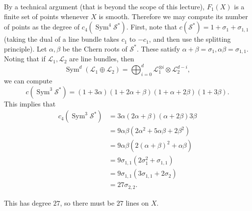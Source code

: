 \documentclass{amsart}
\theoremstyle{definition}
\theoremstyle{remark}
\theoremstyle{plain}
\theoremstyle{definition}
\theoremstyle{remark}
\newcommand{\mc}[1]{\mathcal{#1}}
\newcommand{\on}[1]{\operatorname{#1}}
\newcommand{\1}{\mathbf{1}}
\newcommand{\2}{\mathbf{2}}
\newcommand{\3}{\mathbf{3}}
\begin{document}
By a technical argument (that is beyond the scope of this lecture), $F_1(X)$ is a finite set of points whenever $X$ is smooth. Therefore we may compute its number of points as the degree of $c_4(\on{Sym}^4 \mc{S}^*)$. First, note that $c(\mc{S}^*) = 1 + \sigma_1 + \sigma_{1,1}$ (taking the dual of a line bundle takes $c_1$ to $-c_1$, and then use the splitting principle). Let $\alpha, \beta$ be the Chern roots of $\mc{S}^*$. These satisfy $\alpha + \beta = \sigma_1, \alpha \beta = \sigma_{1,1}$. Noting that if $\mc{L}_1, \mc{L}_2$ are line bundles, then
\[ \on{Sym}^d (\mc{L}_1 \oplus \mc{L}_2) = \bigoplus_{i=0}^d \mc{L}_1^{\otimes i} \otimes \mc{L}_2^{d-i}, \]
we can compute
\[ c(\on{Sym}^3 \mc{S}^*) = (1+3\alpha)(1+2\alpha+\beta)(1+\alpha+2\beta)(1+3\beta). \]
This implies that
\begin{align*}
    c_4(\on{Sym}^3 \mc{S}^*) &= 3\alpha(2\alpha+\beta)(\alpha+2\beta)3\beta \\
    &= 9\alpha\beta(2\alpha^2 + 5\alpha\beta + 2\beta^2) \\
    &= 9\alpha\beta (2(\alpha+\beta)^2 + \alpha\beta) \\
    &= 9\sigma_{1,1}(2\sigma_1^2 + \sigma_{1,1}) \\
    &= 9\sigma_{1,1}(3\sigma_{1,1}+2\sigma_2) \\
    &= 27\sigma_{2,2}.
\end{align*}

This has degree $27$, so there must be $27$ lines on $X$.
\end{document}
